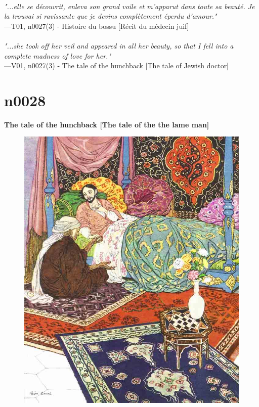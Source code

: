 \documentclass[../Carre_nights.tex]{subfiles}
\begin{document}
\textit{\\
"...elle se découvrit, enleva son grand voile et m’apparut dans toute sa beauté. Je la trouvai si ravissante que je devins complètement éperdu d’amour."} \\
—T01, n0027(3) - Histoire du bossu [Récit du médecin juif] \\~\\
\textit{"...she took off her veil and appeared in all her beauty, so that I fell into a complete madness of love for her."} \\
—V01, n0027(3) - The tale of the hunchback [The tale of Jewish doctor]

\newpage

\section{n0028}
\textbf{\Large{The tale of the hunchback [The tale of the the lame man]}} \\

\begin{figure}[ht]
\centering
\includegraphics[height=\figsize]{illustrations/volume_1/T01, n0028 - Histoire du bossu [Histoire du jeune homme boiteux].jpg}
\end{figure}
\end{document}

